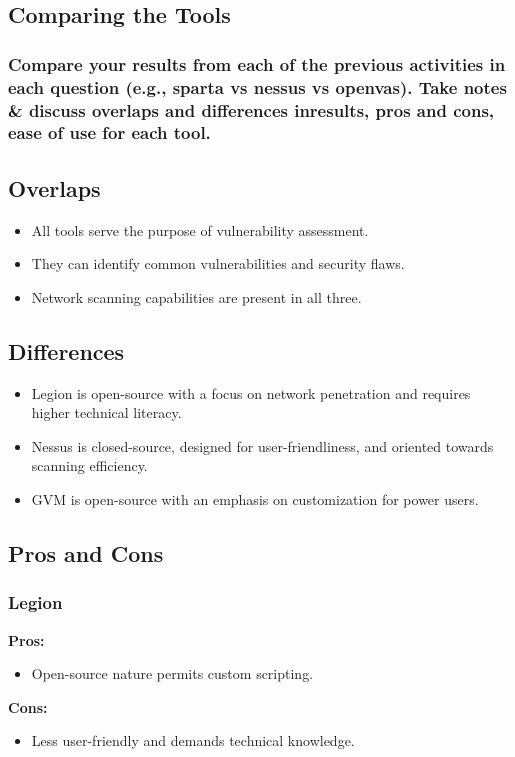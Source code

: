 \subsection{Comparing the Tools}
\subsubsection{Compare your results from each of the previous activities in each question (e.g., sparta vs nessus vs openvas). Take notes \& discuss overlaps and differences inresults, pros and cons, ease of use for each tool.}

\subsection*{Overlaps}
\begin{itemize}
    \item All tools serve the purpose of vulnerability assessment.
    \item They can identify common vulnerabilities and security flaws.
    \item Network scanning capabilities are present in all three.
\end{itemize}

\subsection*{Differences}
\begin{itemize}
    \item Legion is open-source with a focus on network penetration and requires higher technical literacy.
    \item Nessus is closed-source, designed for user-friendliness, and oriented towards scanning efficiency.
    \item GVM is open-source with an emphasis on customization for power users.
\end{itemize}

\subsection*{Pros and Cons}
\subsubsection*{Legion}
\textbf{Pros:}
\begin{itemize}
    \item Open-source nature permits custom scripting.
\end{itemize}
\textbf{Cons:}
\begin{itemize}
    \item Less user-friendly and demands technical knowledge.
\end{itemize}

